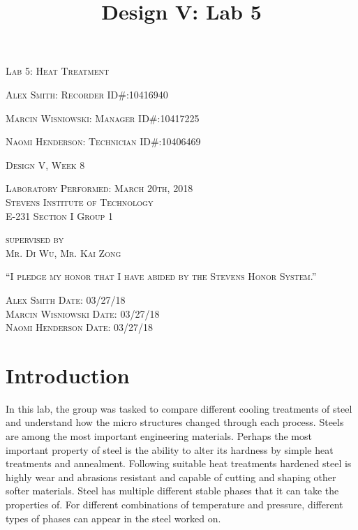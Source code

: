 \documentclass{article}
\begin{document}
\title{Design V: Lab 5}
\begin{titlepage}
    \centering
	{\scshape\LARGE Lab 5: Heat Treatment\par}
	\vspace{1cm}
	{\scshape Alex Smith: Recorder \hfill ID\#:10416940 \par}
	{\scshape Marcin Wisniowski: Manager \hfill ID\#:10417225\par}
	{\scshape Naomi Henderson: Technician \hfill ID\#:10406469\par}
    \vfill
	{\scshape Design V, Week 8\par}
	\vspace{.5cm}
	{\scshape Laboratory Performed: March 20th, 2018\\Stevens Institute of Technology\\E-231 Section I Group 1\par}
	\vspace{.5cm}
	{\scshape supervised by\\Mr. Di Wu, Mr. Kai Zong \par}
    \vfill
	{\scshape“I pledge my honor that I have abided by the Stevens Honor System.”\par}
	\vspace{.5cm}
	{\scshape Alex Smith \hfill Date: 03/27/18\\Marcin Wisniowski \hfill Date: 03/27/18\\ Naomi Henderson \hfill Date: 03/27/18\\}
	\vspace{3cm}
\end{titlepage}

\section{Introduction}
In this lab, the group was tasked to compare different cooling treatments of steel and understand how the micro structures changed through each process. Steels are among the most important engineering materials. Perhaps the most important property of steel is the ability to alter its hardness by simple heat treatments and annealment. Following suitable heat treatments hardened steel is highly wear and abrasions resistant and capable of cutting and shaping other softer materials. Steel has multiple different stable phases that it can take the properties of. For different combinations of temperature and pressure, different types of phases can appear in the steel worked on. 
\end{document}
